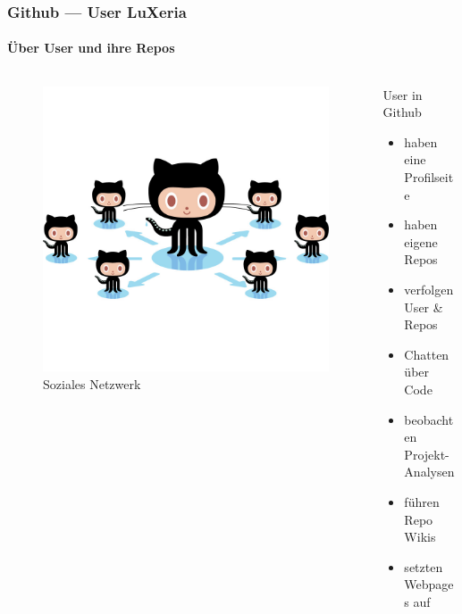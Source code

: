 \begin{frame}
    \frametitle{Github --- User \hfill{} \footnotesize{LuXeria}}
    \framesubtitle{Über User und ihre Repos}
    \begin{columns}
        \begin{column}{5cm}
            \begin{figure}
            \includegraphics[scale=0.15]{github_social.jpg}
            \caption{Soziales Netzwerk}
            \end{figure}
        \end{column}
        \begin{column}{5cm}
            \begin{block}{User in Github}
                \begin{itemize}
                    \item haben eine Profilseite
                    \item haben eigene Repos
                    \item verfolgen User \& Repos
                    \item Chatten über Code
                    \item beobachten Projekt-Analysen
                    \item führen Repo Wikis
                    \item setzten Webpages auf
                \end{itemize}
            \end{block}
        \end{column}
    \end{columns}
\end{frame}

